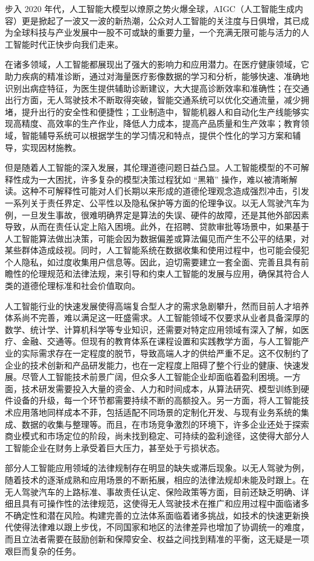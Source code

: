 步入 2020 年代，人工智能大模型以燎原之势火爆全球，AIGC（人工智能生成内容）更是掀起了一波又一波的新热潮，公众对人工智能的关注度与日俱增，其已成为全球科技与产业发展中一股不可或缺的重要力量，一个充满无限可能与活力的人工智能时代正快步向我们走来。


在诸多领域，人工智能都展现出了强大的影响力和应用潜力。在医疗健康领域，它助力疾病的精准诊断，通过对海量医疗影像数据的学习和分析，能够快速、准确地识别出病症特征，为医生提供辅助诊断建议，大大提高诊断效率和准确性；在交通出行方面，无人驾驶技术不断取得突破，智能交通系统可以优化交通流量，减少拥堵，提升出行的安全性和便捷性；工业制造中，智能机器人和自动化生产线能够实现高精度、高效率的生产作业，降低人力成本，提高产品质量和生产效率；教育领域，智能辅导系统可以根据学生的学习情况和特点，提供个性化的学习方案和辅导，实现因材施教。


但是随着人工智能的深入发展，其伦理道德问题日益凸显。人工智能模型的不可解释性成为一大困扰，许多复杂的模型决策过程犹如 “黑箱” 操作，难以被清晰解读。这种不可解释性可能对人们长期以来形成的道德伦理观念造成强烈冲击，引发一系列关于责任界定、公平性以及隐私保护等方面的伦理争议。以无人驾驶汽车为例，一旦发生事故，很难明确界定是算法的失误、硬件的故障，还是其他外部因素导致，从而在责任认定上陷入困境。此外，在招聘、贷款审批等场景中，如果基于人工智能算法做出决策，可能会因为数据偏差或算法偏见而产生不公平的结果，对某些群体造成歧视。同时，人工智能系统在数据收集和使用过程中，也可能会侵犯个人隐私，如过度收集用户信息等。因此，迫切需要建立一套全面、完善且具有前瞻性的伦理规范和法律法规，来引导和约束人工智能的发展与应用，确保其符合人类的道德伦理标准和社会价值取向。


人工智能行业的快速发展使得高端复合型人才的需求急剧攀升，然而目前人才培养体系尚不完善，难以满足这一旺盛需求。人工智能领域不仅要求从业者具备深厚的数学、统计学、计算机科学等专业知识，还需要对特定应用领域有深入了解，如医疗、金融、交通等。但现有的教育体系在课程设置和实践教学方面，与人工智能产业的实际需求存在一定程度的脱节，导致高端人才的供给严重不足。这不仅制约了企业的技术创新和产品研发能力，也在一定程度上阻碍了整个行业的健康、快速发展。尽管人工智能技术前景广阔，但众多人工智能企业却面临着盈利困境。一方面，技术研发需要投入大量的资金、人力和时间成本，从算法研究、模型训练到硬件设备的升级，每一个环节都需要持续不断的高额投入。另一方面，将人工智能技术应用落地同样成本不菲，包括适配不同场景的定制化开发、与现有业务系统的集成、数据的收集与整理等。而且，在市场竞争激烈的环境下，许多企业还处于探索商业模式和市场定位的阶段，尚未找到稳定、可持续的盈利途径，这使得大部分人工智能企业在财务上承受着巨大压力，甚至处于亏损状态。


部分人工智能应用领域的法律规制存在明显的缺失或滞后现象。以无人驾驶为例，随着技术的逐渐成熟和应用场景的不断拓展，相应的法律法规却未能及时跟上。在无人驾驶汽车的上路标准、事故责任认定、保险政策等方面，目前还缺乏明确、详细且具有可操作性的法律规范，这使得无人驾驶技术在推广和应用过程中面临诸多不确定性和潜在风险。构建完善的立法体系面临着诸多挑战，如技术的快速更新换代使得法律难以跟上步伐，不同国家和地区的法律差异也增加了协调统一的难度，而且立法者需要在鼓励创新和保障安全、权益之间找到精准的平衡，这无疑是一项艰巨而复杂的任务。


